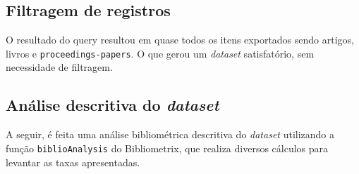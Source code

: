 \subsection{Filtragem de registros}

O resultado do query resultou em quase todos os itens exportados sendo artigos, livros e \texttt{proceedings-papers}. O que gerou um \textit{dataset} satisfatório, sem necessidade de filtragem.

\subsection{Análise descritiva do \textit{dataset} }

A seguir, é feita uma análise bibliométrica descritiva do \textit{dataset} utilizando a função \texttt{biblioAnalysis} do Bibliometrix, que realiza diversos cálculos para levantar as taxas apresentadas.

